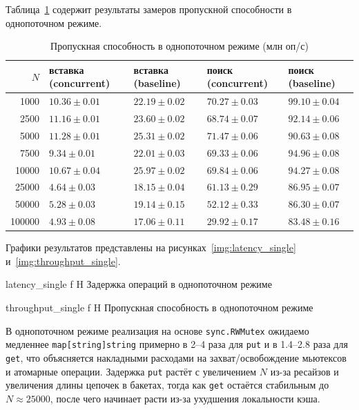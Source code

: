 \documentclass{itmo}
\begin{document}
Таблица~\ref{tab:single-throughput} содержит результаты замеров пропускной способности в однопоточном режиме.

\begin{table}[H]
	\centering
	\caption{Пропускная способность в однопоточном режиме (млн оп/с)}
	\label{tab:single-throughput}
	\begin{tabularx}{\textwidth}{|r|X|X|X|X|}
		\toprule
		$N$ & вставка (concurrent) & вставка (baseline) & поиск (concurrent) & поиск (baseline) \\
		\midrule
		1000 & $10.36 \pm 0.01$ & $22.19 \pm 0.02$ & $70.27 \pm 0.03$ & $99.10 \pm 0.04$ \\
		2500 & $11.16 \pm 0.01$ & $23.60 \pm 0.02$ & $68.74 \pm 0.07$ & $92.14 \pm 0.06$ \\
		5000 & $11.28 \pm 0.01$ & $25.31 \pm 0.02$ & $71.47 \pm 0.06$ & $90.63 \pm 0.08$ \\
		7500 & $9.34 \pm 0.01$ & $22.01 \pm 0.03$ & $69.33 \pm 0.06$ & $94.96 \pm 0.08$ \\
		10000 & $10.67 \pm 0.04$ & $25.97 \pm 0.02$ & $69.84 \pm 0.06$ & $94.27 \pm 0.08$ \\
		25000 & $4.64 \pm 0.03$ & $18.15 \pm 0.04$ & $61.13 \pm 0.29$ & $86.95 \pm 0.07$ \\
		50000 & $5.28 \pm 0.03$ & $19.14 \pm 0.15$ & $52.12 \pm 0.33$ & $86.30 \pm 0.07$ \\
		100000 & $4.93 \pm 0.08$ & $17.06 \pm 0.11$ & $29.92 \pm 0.17$ & $83.48 \pm 0.16$ \\
		\bottomrule
	\end{tabularx}
\end{table}

Графики результатов представлены на рисунках~\ref{img:latency_single} и~\ref{img:throughput_single}.

	{latency_single}
	{f}
	{H}
	{\textwidth}
	{Задержка операций в однопоточном режиме}

	{throughput_single}
	{f}
	{H}
	{\textwidth}
	{Пропускная способность в однопоточном режиме}

В однопоточном режиме реализация на основе \texttt{sync.RWMutex} ожидаемо медленнее \texttt{map[string]string} примерно в 2--4 раза для \texttt{put} и в 1.4--2.8 раза для \texttt{get}, что объясняется накладными расходами на захват/освобождение мьютексов и атомарные операции.
Задержка \texttt{put} растёт с увеличением $N$ из-за ресайзов и увеличения длины цепочек в бакетах, тогда как \texttt{get} остаётся стабильным до $N \approx 25000$, после чего начинает расти из-за ухудшения локальности кэша.
\end{document}
